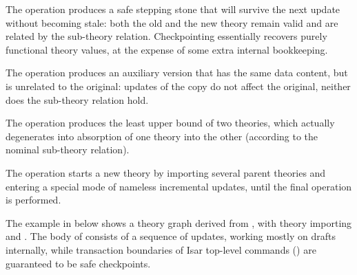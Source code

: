 \begin{isabellebody}
\begin{isamarkuptext}
  The  operation produces a safe stepping stone
  that will survive the next update without becoming stale: both the
  old and the new theory remain valid and are related by the
  sub-theory relation.  Checkpointing essentially recovers purely
  functional theory values, at the expense of some extra internal
  bookkeeping.

  The  operation produces an auxiliary version that has
  the same data content, but is unrelated to the original: updates of
  the copy do not affect the original, neither does the sub-theory
  relation hold.

  The  operation produces the least upper bound of two
  theories, which actually degenerates into absorption of one theory
  into the other (according to the nominal sub-theory relation).

  The  operation starts a new theory by importing
  several parent theories and entering a special mode of nameless
  incremental updates, until the final  operation is
  performed.

  \medskip The example in  below shows a theory
  graph derived from , with theory 
  importing  and .  The body of  consists of a sequence of updates, working mostly on
  drafts internally, while transaction boundaries of Isar top-level
  commands () are guaranteed to be safe
  checkpoints.


\end{isamarkuptext}
\end{isabellebody}
